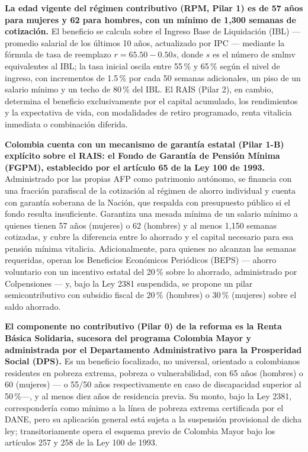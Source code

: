 \documentclass[12pt, letterpaper]{article}
\begin{document}
\textbf{La edad vigente del régimen contributivo (RPM, Pilar 1) es de 57 años para mujeres y 62 para hombres, con un mínimo de 1{,}300 semanas de cotización.} El beneficio se calcula sobre el Ingreso Base de Liquidación (IBL) --- promedio salarial de los últimos 10 años, actualizado por IPC --- mediante la fórmula de tasa de reemplazo $r = 65.50 - 0.50s$, donde $s$ es el número de smlmv equivalentes al IBL; la tasa inicial oscila entre 55\,\% y 65\,\% según el nivel de ingreso, con incrementos de 1.5\,\% por cada 50 semanas adicionales, un piso de un salario mínimo y un techo de 80\,\% del IBL. El RAIS (Pilar 2), en cambio, determina el beneficio exclusivamente por el capital acumulado, los rendimientos y la expectativa de vida, con modalidades de retiro programado, renta vitalicia inmediata o combinación diferida.

\textbf{Colombia cuenta con un mecanismo de garantía estatal (Pilar 1-B) explícito sobre el RAIS: el Fondo de Garantía de Pensión Mínima (FGPM), establecido por el artículo 65 de la Ley 100 de 1993.} Administrado por las propias AFP como patrimonio autónomo, se financia con una fracción parafiscal de la cotización al régimen de ahorro individual y cuenta con garantía soberana de la Nación, que respalda con presupuesto público si el fondo resulta insuficiente. Garantiza una mesada mínima de un salario mínimo a quienes tienen 57 años (mujeres) o 62 (hombres) y al menos 1{,}150 semanas cotizadas, y cubre la diferencia entre lo ahorrado y el capital necesario para esa pensión mínima vitalicia. Adicionalmente, para quienes no alcanzan las semanas requeridas, operan los Beneficios Económicos Periódicos (BEPS) --- ahorro voluntario con un incentivo estatal del 20\,\% sobre lo ahorrado, administrado por Colpensiones --- y, bajo la Ley 2381 suspendida, se propone un pilar semicontributivo con subsidio fiscal de 20\,\% (hombres) o 30\,\% (mujeres) sobre el saldo ahorrado.

\textbf{El componente no contributivo (Pilar 0) de la reforma es la Renta Básica Solidaria, sucesora del programa Colombia Mayor y administrada por el Departamento Administrativo para la Prosperidad Social (DPS).} Es un beneficio focalizado, no universal, orientado a colombianos residentes en pobreza extrema, pobreza o vulnerabilidad, con 65 años (hombres) o 60 (mujeres) --- o 55/50 años respectivamente en caso de discapacidad superior al 50\,\%---, y al menos diez años de residencia previa. Su monto, bajo la Ley 2381, correspondería como mínimo a la línea de pobreza extrema certificada por el DANE, pero su aplicación general está sujeta a la suspensión provisional de dicha ley; transitoriamente opera el esquema previo de Colombia Mayor bajo los artículos 257 y 258 de la Ley 100 de 1993.
\end{document}
